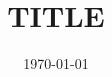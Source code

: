 
\subject{Sheet Nr. 1}
\title{TITLE}
\date{\today}



\maketitle
\thispagestyle{empty}
\newpage




